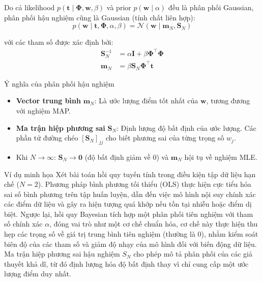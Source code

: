Do cả likelihood $p(\mathbf{t} \mid \mathbf{\Phi}, \mathbf{w}, \beta)$ và prior $p(\mathbf{w} \mid \alpha)$ đều là phân phối Gaussian, phân phối hậu nghiệm cũng là Gaussian (tính chất liên hợp):
\begin{equation}
p(\mathbf{w} \mid \mathbf{t}, \mathbf{\Phi}, \alpha, \beta) = \mathcal{N}(\mathbf{w} \mid \mathbf{m}_N, \mathbf{S}_N)
\label{eq:posterior}
\end{equation}

với các tham số được xác định bởi:
\begin{align}
\mathbf{S}_N^{-1} &= \alpha\mathbf{I} + \beta\mathbf{\Phi}^{\top}\mathbf{\Phi} \label{eq:posterior_cov_inv} \\
\mathbf{m}_N &= \beta\mathbf{S}_N\mathbf{\Phi}^{\top}\mathbf{t} \label{eq:posterior_mean}
\end{align}

\begin{importantbox}{Ý nghĩa của phân phối hậu nghiệm}
\begin{itemize}
    \item \textbf{Vector trung bình} $\mathbf{m}_N$: Là ước lượng điểm tốt nhất của $\mathbf{w}$, tương đương với nghiệm MAP.
    \item \textbf{Ma trận hiệp phương sai} $\mathbf{S}_N$: Định lượng độ bất định của ước lượng. Các phần tử đường chéo $[\mathbf{S}_N]_{jj}$ cho biết phương sai của từng trọng số $w_j$.
    \item Khi $N \to \infty$: $\mathbf{S}_N \to \mathbf{0}$ (độ bất định giảm về 0) và $\mathbf{m}_N$ hội tụ về nghiệm MLE.
\end{itemize}
\end{importantbox}

\begin{examplebox} {Ví dụ minh họa}
Xét bài toán hồi quy tuyến tính trong điều kiện tập dữ liệu hạn chế ($N=2$). Phương pháp bình phương tối thiểu (OLS) thực hiện cực tiểu hóa sai số bình phương trên tập huấn luyện, dẫn đến việc mô hình nội suy chính xác các điểm dữ liệu và gây ra hiện tượng quá khớp  nếu tồn tại nhiễu hoặc điểm dị biệt. Ngược lại, hồi quy Bayesian tích hợp một phân phối tiên nghiệm với tham số chính xác  $\alpha$, đóng vai trò như một cơ chế chuẩn hóa, cơ chế này thực hiện thu hẹp các trọng số về giá trị trung bình tiên nghiệm (thường là 0), nhằm kiểm soát biên độ của các tham số và giảm độ nhạy của mô hình đối với biến động dữ liệu. Ma trận hiệp phương sai hậu nghiệm $S_N$ cho phép mô tả phân phối của các giả thuyết khả dĩ, từ đó định lượng hóa độ bất định thay vì chỉ cung cấp một ước lượng điểm duy nhất.    
\end{examplebox}

